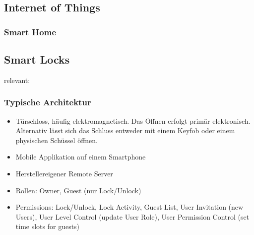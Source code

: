 \subsection{Internet of Things}
\label{sec:iot}
\subsubsection{Smart Home}
\label{sec:smart_home}

\subsection{Smart Locks}
\label{sec:smart_locks}

	relevant: \cite{Ye2017}\cite{Fuller2017}\cite{Rose2016}\cite{Ho2016}
	
	\subsubsection{Typische Architektur}
		\begin{itemize}
			\item Türschloss, häufig elektromagnetisch. Das Öffnen erfolgt primär elektronisch. Alternativ lässt sich das Schluss entweder mit einem Keyfob oder einem physischen Schüssel öffnen.
			\item Mobile Applikation auf einem Smartphone
			\item Herstellereigener Remote Server
		\end{itemize}
		\begin{itemize}
			\item Rollen: Owner, Guest (nur Lock/Unlock)
			\item Permissions: Lock/Unlock, Lock Activity, Guest List, User Invitation (new Users), User Level Control (update User Role), User Permission Control (set time slots for guests)
		\end{itemize}